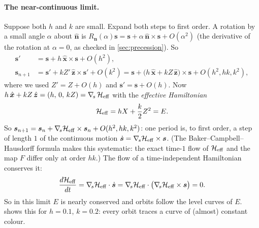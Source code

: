 \documentclass[11pt,a4paper]{article}
\newcommand{\vs}{\bm{s}}
\begin{document}
\paragraph{The near-continuous limit.} Suppose both $h$ and $k$ are small. Expand both steps to first order. A
rotation by a small angle $\alpha$ about $\hat{\bm n}$ is $R_{\hat{\bm n}}(\alpha)\vs = \vs + \alpha\,\hat{\bm n}
\times\vs + O(\alpha^2)$ (the derivative of the rotation at $\alpha = 0$, as checked in \cref{sec:precession}).
So
\begin{align*}
  \vs' &= \vs + h\,\hat{\bm x}\times\vs + O(h^2), \\
  \vs_{n+1} &= \vs' + kZ'\,\hat{\bm z}\times\vs' + O(k^2) = \vs + \big(h\,\hat{\bm x} + kZ\,\hat{\bm z}\big)\times\vs
  + O(h^2, hk, k^2),
\end{align*}
where we used $Z' = Z + O(h)$ and $\vs' = \vs + O(h)$. Now $h\,\hat{\bm x} + kZ\,\hat{\bm z} = (h,\, 0,\, kZ) =
\nabla_{\!s}\,\mathcal H_{\rm eff}$ with the \emph{effective Hamiltonian}
\begin{equation}\label{eq:heff}
  \mathcal H_{\rm eff} = hX + \frac{k}{2}Z^2 = E .
\end{equation}
So $\vs_{n+1} = \vs_n + \nabla_{\!s} \mathcal H_{\rm eff}\times\vs_n + O(h^2, hk, k^2)$: one period is, to first order, a step
of length $1$ of the continuous motion $\dot{\vs} = \nabla_{\!s} \mathcal H_{\rm eff}\times\vs$. (The Baker--Campbell--Hausdorff
formula makes this systematic: the exact time-$1$ flow of $\mathcal H_{\rm eff}$ and the map $F$ differ only at order $hk$.)
The flow of a time-independent Hamiltonian conserves it:
\begin{equation*}
  \frac{d \mathcal H_{\rm eff}}{dt} = \nabla_{\!s} \mathcal H_{\rm eff}\cdot\dot{\vs} = \nabla_{\!s} \mathcal H_{\rm eff}\cdot\big(\nabla_{\!s}
  \mathcal H_{\rm eff}\times\vs\big) = 0 .
\end{equation*}
So in this limit $E$ is nearly conserved and orbits follow the level curves of $E$.  shows this
for $h = 0.1$, $k = 0.2$: every orbit traces a curve of (almost) constant colour.
\end{document}
